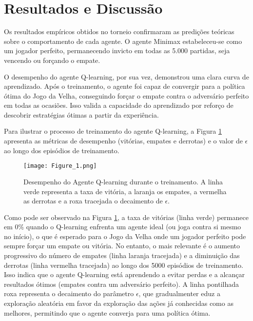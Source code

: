 \documentclass[conference]{IEEEtran}
\begin{document}
\section{Resultados e Discussão}
Os resultados empíricos obtidos no torneio confirmaram as predições teóricas sobre o comportamento de cada agente. O agente Minimax estabeleceu-se como um jogador perfeito, permanecendo invicto em todas as 5.000 partidas, seja vencendo ou forçando o empate.

O desempenho do agente Q-learning, por sua vez, demonstrou uma clara curva de aprendizado. Após o treinamento, o agente foi capaz de convergir para a política ótima do Jogo da Velha, conseguindo forçar o empate contra o adversário perfeito em todas as ocasiões. Isso valida a capacidade do aprendizado por reforço de descobrir estratégias ótimas a partir da experiência.

Para ilustrar o processo de treinamento do agente Q-learning, a Figura \ref{fig:q_learning_performance} apresenta as métricas de desempenho (vitórias, empates e derrotas) e o valor de $\epsilon$ ao longo dos episódios de treinamento.

\begin{figure}[H]
\centering
\texttt{[image: Figure\_1.png]} %
\caption{Desempenho do Agente Q-learning durante o treinamento. A linha verde representa a taxa de vitória, a laranja os empates, a vermelha as derrotas e a roxa tracejada o decaimento de $\epsilon$.}
\label{fig:q_learning_performance}
\end{figure}

Como pode ser observado na Figura \ref{fig:q_learning_performance}, a taxa de vitórias (linha verde) permanece em 0\% quando o Q-learning enfrenta um agente ideal (ou joga contra si mesmo no início), o que é esperado para o Jogo da Velha onde um jogador perfeito pode sempre forçar um empate ou vitória. No entanto, o mais relevante é o aumento progressivo do número de empates (linha laranja tracejada) e a diminuição das derrotas (linha vermelha tracejada) ao longo dos 5000 episódios de treinamento. Isso indica que o agente Q-learning está aprendendo a evitar perdas e a alcançar resultados ótimos (empates contra um adversário perfeito). A linha pontilhada roxa representa o decaimento do parâmetro $\epsilon$, que gradualmenter eduz a exploração aleatória em favor da exploração das ações já conhecidas como as melhores, permitindo que o agente converja para uma política ótima.
\end{document}

